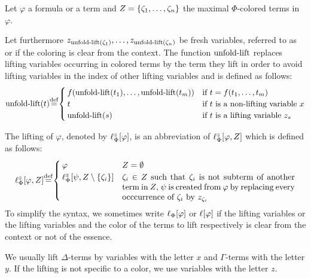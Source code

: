 \begin{defi}[Lifting]
	Let $\varphi$ a formula or a term and $Z=\{\zeta_{1}, \dotsc, \zeta_{n}\}$ the maximal $\Phi$-colored terms in $\varphi$.

	Let furthermore $z_{\operatorname{unfold-lift}(\zeta_{1})}, \ldots, z_{\operatorname{unfold-lift}(\zeta_{n})}$ be fresh variables, referred to as  or  if the coloring is clear from the context.
	The function $\operatorname{unfold-lift}$ replaces lifting variables occurring in colored terms by the term they lift in order to avoid lifting variables in the index of other lifting variables and is defined as follows:  
	\[\expa(t) \defeq \begin{cases}
			f(\expa(t_1),\dots, \expa(t_m)) & \text{if $t=f(t_1, \dots, t_m)$} \\
			t & \text{if $t$ is a non-lifting variable $x$} \\
			\expa(s) & \text{if $t$ is a lifting variable $z_s$}
	\end{cases}\]

	The lifting of $\varphi$, denoted by $\ell_{\Phi}^{z}[\varphi]$, is an abbreviation of 
	$\ell_{\Phi}^{z}[\varphi, Z]$ which is defined as follows:
	\[
		\lifphi{\varphi, Z} \defeq
		\begin{cases}
			\varphi & Z = \emptyset \\
			\lifphi{\psi, Z\setminus\{\colterm{i}\}} & \parbox[t]{0.6\linewidth}{$\colterm{i} \in Z$ such that $\colterm{i}$ is not subterm of another term in $Z$, $\psi$ is created from $\varphi$ by replacing every occcurrence of $\colterm{i}$ by $z_{\colterm{i}}$} 
		\end{cases}
	\]
	To simplify the syntax, we sometimes write $\ell_{\Phi}[\varphi]$ or $\ell[\varphi]$ if the lifting variables or the lifting variables and the color of the terms to lift respectively is clear from the context or not of the essence.
\end{defi}

We usually lift $\Delta$-terms by variables with the letter $x$ and $\Gamma$-terms with the letter $y$. If the lifting is not specific to a color, we use variables with the letter $z$.


